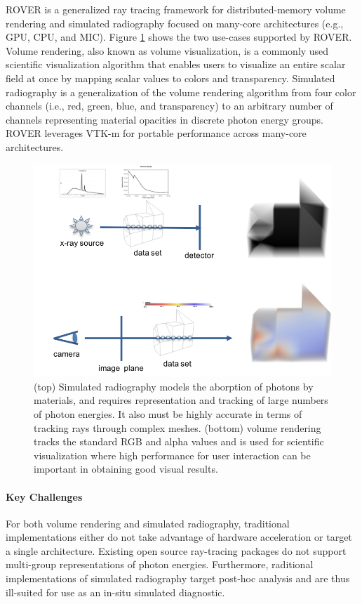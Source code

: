 ROVER is a generalized ray tracing framework for distributed-memory volume
rendering and simulated radiography \cite{rover-laney} focused on many-core architectures (e.g.,
GPU, CPU, and MIC).  Figure \ref{fig:rover-overview} shows the two use-cases
supported by ROVER. Volume rendering, also known as volume visualization, is a
commonly used scientific visualization algorithm that enables users to
visualize an entire scalar field at once by mapping scalar values to colors and
transparency.  Simulated radiography is a generalization of the volume
rendering algorithm from four color channels (i.e., red, green, blue, and
transparency) to an arbitrary number of channels representing material
opacities in discrete photon energy groups. ROVER leverages VTK-m
\cite{rover-vtkm} for portable performance across many-core architectures. 
\begin{figure}[htb]
	\centering
	\includegraphics[width=6in]{projects/2.3.6-NNSA/2.3.6.02-LLNL-ATDM/ROVER}
	\caption{\label{fig:rover-overview} (top) Simulated radiography models
the aborption of photons by materials, and requires representation and tracking
of large numbers of photon energies. It also must be highly accurate in terms
of tracking rays through complex meshes. (bottom) volume rendering tracks the
standard RGB and alpha values and is used for scientific visualization where
high performance for user interaction can be important in obtaining good visual
results.} \end{figure}


\paragraph{Key Challenges}
For both volume rendering and simulated radiography, traditional
implementations either do not take advantage of hardware acceleration or
target a single architecture. Existing open source ray-tracing packages do not
support multi-group representations of photon energies.  Furthermore,
raditional implementations of simulated radiography target post-hoc analysis
and are thus ill-suited for use as an in-situ simulated diagnostic. 

